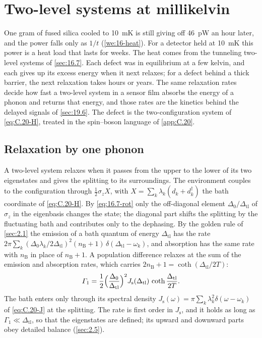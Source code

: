 \section{Two-level systems at millikelvin}\label{sec:16.8}

One gram of fused silica cooled to \SI{10}{mK} is still giving off \SI{46}{pW} an hour later, and the power falls only as $1/t$ (\cref{we:16-heat}). For a detector held at \SI{10}{mK} this power is a heat load that lasts for weeks. The heat comes from the tunneling two-level systems of \cref{sec:16.7}. Each defect was in equilibrium at a few kelvin, and each gives up its excess energy when it next relaxes; for a defect behind a thick barrier, the next relaxation takes hours or years. The same relaxation rates decide how fast a two-level system in a sensor film absorbs the energy of a phonon and returns that energy, and those rates are the kinetics behind the delayed signals of \cref{sec:19.6}. The defect is the two-configuration system of \cref{eq:C.20-H}, treated in the spin--boson language of \cref{app:C.20}.

\subsection{Relaxation by one phonon}\label{sec:16.8-phonon}

A two-level system relaxes when it passes from the upper to the lower of its two eigenstates and gives the splitting to its surroundings. The environment couples to the configuration through $\tfrac12\sigma_z X$, with $X = \sum_k\lambda_k(d_k + d_k^\dagger)$ the bath coordinate of \cref{eq:C.20-H}. By \cref{eq:16.7-rot} only the off-diagonal element $\Delta_0/\Delta_{\mathrm{tl}}$ of $\sigma_z$ in the eigenbasis changes the state; the diagonal part shifts the splitting by the fluctuating bath and contributes only to the dephasing. By the golden rule of \cref{sec:2.1} the emission of a bath quantum of energy $\Delta_{\mathrm{tl}}$ has the rate $2\pi\sum_k(\Delta_0\lambda_k/2\Delta_{\mathrm{tl}})^2(n_{\mathrm{B}} + 1)\,\delta(\Delta_{\mathrm{tl}} - \omega_k)$, and absorption has the same rate with $n_{\mathrm{B}}$ in place of $n_{\mathrm{B}} + 1$. A population difference relaxes at the sum of the emission and absorption rates, which carries $2n_{\mathrm{B}} + 1 = \coth(\Delta_{\mathrm{tl}}/2T)$:
\begin{equation}
  \varGamma_1 = \frac12\Bigl(\frac{\Delta_0}{\Delta_{\mathrm{tl}}}\Bigr)^2 J_{\mathrm{s}}(\Delta_{\mathrm{tl}})\,\coth\frac{\Delta_{\mathrm{tl}}}{2T} .
  \label{eq:16.8-golden}
\end{equation}
The bath enters only through its spectral density $J_{\mathrm{s}}(\omega) = \pi\sum_k\lambda_k^2\delta(\omega - \omega_k)$ of \cref{eq:C.20-J} at the splitting. The rate is first order in $J_{\mathrm{s}}$, and it holds as long as $\varGamma_1 \ll \Delta_{\mathrm{tl}}$, so that the eigenstates are defined; its upward and downward parts obey detailed balance (\cref{sec:2.5}).

